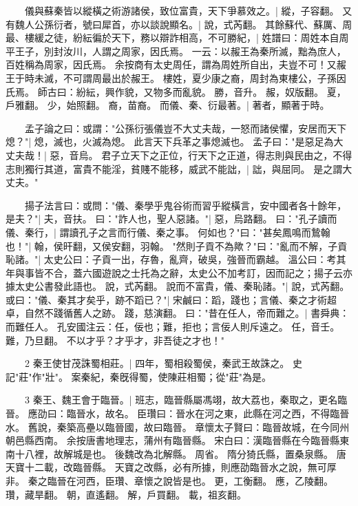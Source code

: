 　　儀與蘇秦皆以縱橫之術游諸侯，致位富貴，天下爭慕效之。|{
	縱，子容翻。
}
又有魏人公孫衍者，號曰犀首，亦以談說顯名。|{
	說，式芮翻。
}
其餘蘇代、蘇厲、周最、樓緩之徒，紛紜徧於天下，務以辯詐相高，不可勝紀，|{
	姓譜曰：周姓本自周平王子，別封汝川，人謂之周家，因氏焉。
	一云：以赧王為秦所滅，黜為庶人，百姓稱為周家，因氏焉。
	余按商有太史周任，謂為周姓所自出，夫豈不可！又赧王于時未滅，不可謂周最出於赧王。
	樓姓，夏少康之裔，周封為東樓公，子孫因氏焉。
	師古曰：紛紜，興作貌，又物多而亂貌。
	勝，音升。
	赧，奴版翻。
	夏，戶雅翻。
	少，始照翻。
	裔，苗裔。
}
而儀、秦、衍最著。|{
	著者，顯著于時。
}

　　孟子論之曰：或謂："公孫衍張儀豈不大丈夫哉，一怒而諸侯懼，安居而天下熄？"|{
	熄，滅也，火滅為熄。
	此言天下兵革之事熄滅也。
}
孟子曰："是惡足為大丈夫哉！|{
	惡，音烏。
}
君子立天下之正位，行天下之正道，得志則與民由之，不得志則獨行其道，富貴不能淫，貧賤不能移，威武不能詘，|{
	詘，與屈同。
}
是之謂大丈夫。"

　　揚子法言曰：或問："儀、秦學乎鬼谷術而習乎縱橫言，安中國者各十餘年，是夫？"|{
	夫，音扶。
}
曰："詐人也，聖人惡諸。"|{
	惡，烏路翻。
}
曰："孔子讀而儀、秦行，|{
	謂讀孔子之言而行儀、秦之事。
}
何如也？"曰："甚矣鳳鳴而鷙翰也！"|{
	翰，侯旰翻，又侯安翻，羽翰。
}
"然則子貢不為歟？"曰："亂而不解，子貢恥諸。"|{
	太史公曰：子貢一出，存魯，亂齊，破吳，強晉而霸越。
	溫公曰：考其年與事皆不合，蓋六國遊說之士托為之辭，太史公不加考訂，因而記之；揚子云亦據太史公書發此語也。
	說，式芮翻。
}
說而不富貴，儀、秦恥諸。"|{
	說，式芮翻。
}
或曰："儀、秦其才矣乎，跡不蹈已？"|{
	宋鹹曰：蹈，踐也；言儀、秦之才術超卓，自然不踐循舊人之跡。
	踐，慈演翻。
}
曰："昔在任人，帝而難之。|{
	書舜典：而難任人。
	孔安國注云：任，佞也；難，拒也；言佞人則斥遠之。
	任，音壬。
	難，乃旦翻。
}
不以才乎？才乎才，非吾徒之才也！"

　　2 秦王使甘茂誅蜀相莊。|{
	四年，蜀相殺蜀侯，秦武王故誅之。
	史記"莊"作"壯"。
	案秦紀，秦旣得蜀，使陳莊相蜀；從"莊"為是。
}

　　3 秦王、魏王會于臨晉。|{
	班志，臨晉縣屬馮翊，故大荔也，秦取之，更名臨晉。
	應劭曰：臨晉水，故名。
	臣瓚曰：晉水在河之東，此縣在河之西，不得臨晉水。
	舊說，秦築高壘以臨晉國，故曰臨晉。
	章懷太子賢曰：臨晉故城，在今同州朝邑縣西南。
	余按唐書地理志，蒲州有臨晉縣。
	宋白曰：漢臨晉縣在今臨晉縣東南十八裡，故解城是也。
	後魏改為北解縣。
	周省。
	隋分猗氏縣，置桑泉縣。
	唐天寶十二載，改臨晉縣。
	天寶之改縣，必有所據，則應劭臨晉水之說，無可厚非。
	秦之臨晉在河西，臣瓚、章懷之說皆是也。
	更，工衡翻。
	應，乙陵翻。
	瓚，藏旱翻。
	朝，直遙翻。
	解，戶買翻。
	載，祖亥翻。
}

